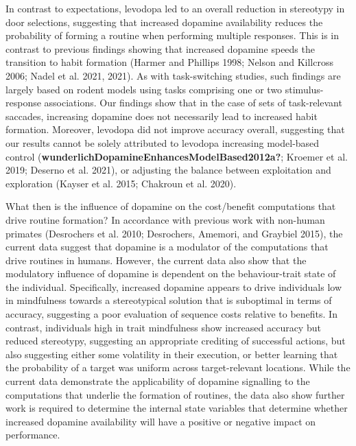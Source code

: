 \documentclass{article}
\begin{document}
In contrast to expectations, levodopa led to an overall reduction in
stereotypy in door selections, suggesting that increased dopamine
availability reduces the probability of forming a routine when
performing multiple responses. This is in contrast to previous findings
showing that increased dopamine speeds the transition to habit formation
(Harmer and Phillips 1998; Nelson and Killcross 2006; Nadel et al. 2021,
2021). As with task-switching studies, such findings are largely based
on rodent models using tasks comprising one or two stimulus-response
associations. Our findings show that in the case of sets of
task-relevant saccades, increasing dopamine does not necessarily lead to
increased habit formation. Moreover, levodopa did not improve accuracy
overall, suggesting that our results cannot be solely attributed to
levodopa increasing model-based control
(\textbf{wunderlichDopamineEnhancesModelBased2012a?}; Kroemer et al.
2019; Deserno et al. 2021), or adjusting the balance between
exploitation and exploration (Kayser et al. 2015; Chakroun et al. 2020).

What then is the influence of dopamine on the cost/benefit computations
that drive routine formation? In accordance with previous work with
non-human primates (Desrochers et al. 2010; Desrochers, Amemori, and
Graybiel 2015), the current data suggest that dopamine is a modulator of
the computations that drive routines in humans. However, the current
data also show that the modulatory influence of dopamine is dependent on
the behaviour-trait state of the individual. Specifically, increased
dopamine appears to drive individuals low in mindfulness towards a
stereotypical solution that is suboptimal in terms of accuracy,
suggesting a poor evaluation of sequence costs relative to benefits. In
contrast, individuals high in trait mindfulness show increased accuracy
but reduced stereotypy, suggesting an appropriate crediting of
successful actions, but also suggesting either some volatility in their
execution, or better learning that the probability of a target was
uniform across target-relevant locations. While the current data
demonstrate the applicability of dopamine signalling to the computations
that underlie the formation of routines, the data also show further work
is required to determine the internal state variables that determine
whether increased dopamine availability will have a positive or negative
impact on performance.
\end{document}
